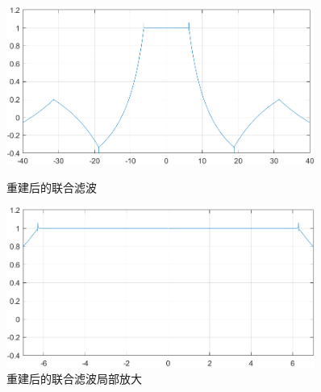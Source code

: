 \documentclass{../source/Experiment}
\begin{document}
\begin{figure}[H]
                \vspace{15pt}

                \begin{minipage}[t]{0.48\textwidth}
                    \centering
                    \includegraphics[width=0.9\textwidth]{pic/重建后的联合滤波.png}
                    \caption{重建后的联合滤波}
                \end{minipage}
                \begin{minipage}[t]{0.48\textwidth}
                    \centering
                    \includegraphics[width=0.9\textwidth]{pic/联合局部放大.png}
                    \caption{重建后的联合滤波局部放大}
                \end{minipage}

                \vspace{15pt}


\end{figure}
\end{document}
